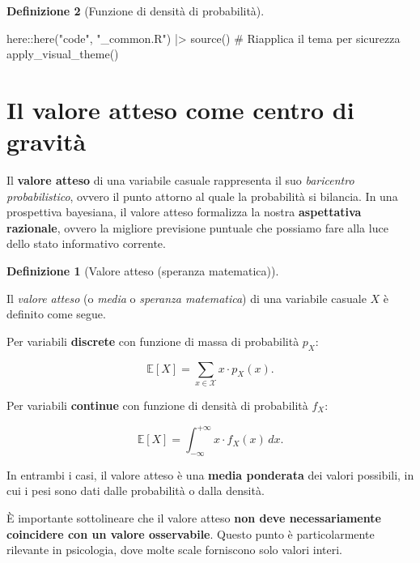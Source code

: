 \documentclass[
  italian,
  letterpaper,
  a4paper,
  11pt,
  open=any]{scrbook}
\newenvironment{Shaded}{\begin{snugshade}}{\end{snugshade}}
\newcommand{\CommentTok}[1]{\textcolor[rgb]{0.37,0.37,0.37}{#1}}
\newcommand{\FunctionTok}[1]{\textcolor[rgb]{0.28,0.35,0.67}{#1}}
\newcommand{\NormalTok}[1]{\textcolor[rgb]{0.00,0.23,0.31}{#1}}
\newcommand{\SpecialCharTok}[1]{\textcolor[rgb]{0.37,0.37,0.37}{#1}}
\newcommand{\StringTok}[1]{\textcolor[rgb]{0.13,0.47,0.30}{#1}}
\theoremstyle{plain}
\theoremstyle{definition}
\theoremstyle{definition}
\newtheorem{definition}{Definizione}[chapter]
\theoremstyle{remark}
\begin{document}
\begin{definition}[Funzione di densità di
probabilità]
\begin{tcolorbox}
\begin{Shaded}
\begin{Highlighting}[]
\NormalTok{here}\SpecialCharTok{::}\FunctionTok{here}\NormalTok{(}\StringTok{"code"}\NormalTok{, }\StringTok{"\_common.R"}\NormalTok{) }\SpecialCharTok{|\textgreater{}} 
  \FunctionTok{source}\NormalTok{()}
\CommentTok{\# Riapplica il tema per sicurezza}
\FunctionTok{apply\_visual\_theme}\NormalTok{()}
\end{Highlighting}
\end{Shaded}

\end{tcolorbox}

\section{Il valore atteso come centro di
gravità}\label{sec-expected-value}

Il \textbf{valore atteso} di una variabile casuale rappresenta il suo
\emph{baricentro probabilistico}, ovvero il punto attorno al quale la
probabilità si bilancia. In una prospettiva bayesiana, il valore atteso
formalizza la nostra \textbf{aspettativa razionale}, ovvero la migliore
previsione puntuale che possiamo fare alla luce dello stato informativo
corrente.

\begin{definition}[Valore atteso (speranza
matematica)]\protect\hypertarget{def-expected-value}{}\label{def-expected-value}

Il \emph{valore atteso} (o \emph{media} o \emph{speranza matematica}) di
una variabile casuale \(X\) è definito come segue.

Per variabili \textbf{discrete} con funzione di massa di probabilità
\(p_X\):

\[
\mathbb{E}[X] = \sum_{x \in \mathcal{X}} x \cdot p_X(x).
\]

Per variabili \textbf{continue} con funzione di densità di probabilità
\(f_X\):

\[
\mathbb{E}[X] = \int_{-\infty}^{+\infty} x \cdot f_X(x)\,dx.
\]

\end{definition}

In entrambi i casi, il valore atteso è una \textbf{media ponderata} dei
valori possibili, in cui i pesi sono dati dalle probabilità o dalla
densità.

È importante sottolineare che il valore atteso \textbf{non deve
necessariamente coincidere con un valore osservabile}. Questo punto è
particolarmente rilevante in psicologia, dove molte scale forniscono
solo valori interi.


\end{definition}
\end{document}
